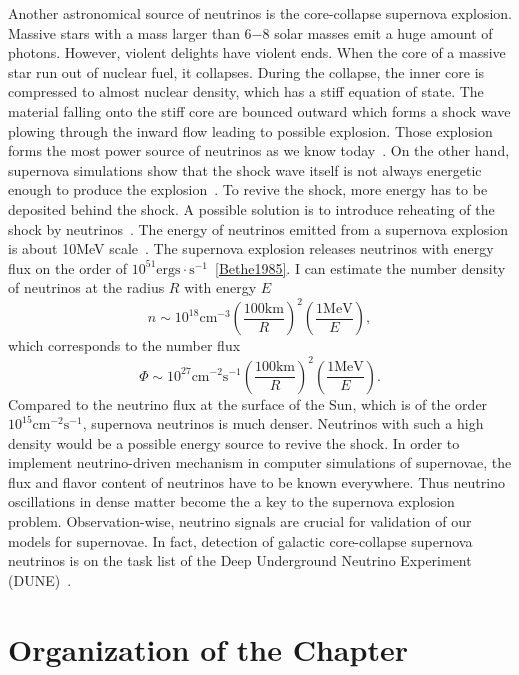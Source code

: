 Another astronomical source of neutrinos is the core-collapse supernova explosion. Massive stars with a mass larger than 6−8 solar masses emit a huge amount of photons. However, violent delights have violent ends. When the core of a massive star run out of nuclear fuel, it collapses. During the collapse, the inner core is compressed to almost nuclear density, which has a stiff equation of state. The material falling onto the stiff core are bounced outward which forms a shock wave plowing through the inward flow leading to possible explosion. Those explosion forms the most power source of neutrinos as we know today~\cite{Raffelt1996wa}. On the other hand, supernova simulations show that the shock wave itself is not always energetic enough to produce the explosion~\cite{Janka2016b}. To revive the shock, more energy has to be deposited behind the shock. A possible solution is to introduce reheating of the shock by neutrinos~\cite{Janka2016b}. The energy of neutrinos emitted from a supernova explosion is about 10MeV scale~\cite{Janka2017}. The supernova explosion releases neutrinos with energy flux on the order of $10^{51}\mathrm{ergs\cdot s^{-1}}$~\ref{Bethe1985}. I can estimate the number density of neutrinos at the radius $R$ with energy $E$
\begin{equation*}
   n \sim  10^{18} \mathrm{cm^{-3}} \left(\frac{100\mathrm{km}}{R}\right)^2 \left(\frac{1\mathrm{MeV}}{E}\right),
\end{equation*}
which corresponds to the number flux
\begin{equation*}
  \Phi \sim 10^{27} \mathrm{cm^{-2} s^{-1}}\left(\frac{100\mathrm{km}}{R}\right)^2 \left(\frac{1\mathrm{MeV}}{E}\right).
\end{equation*}
Compared to the neutrino flux at the surface of the Sun, which is of the order $10^{15}\mathrm{cm^{-2} s^{-1}}$, supernova neutrinos is much denser. Neutrinos with such a high density would be a possible energy source to revive the shock. In order to implement neutrino-driven mechanism in computer simulations of supernovae, the flux and flavor content of neutrinos have to be known everywhere. Thus neutrino oscillations in dense matter become the a key to the supernova explosion problem. Observation-wise, neutrino signals are crucial for validation of our models for supernovae. In fact, detection of galactic core-collapse supernova neutrinos is on the task list of the Deep Underground Neutrino Experiment (DUNE)~\cite{Kemp2017}.




\section{Organization of the Chapter}


